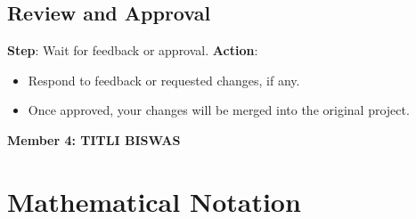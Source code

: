 \documentclass{article}
\begin{document}
\subsection{Review and Approval}
\textbf{Step}: Wait for feedback or approval.
\textbf{Action}:
\begin{itemize}
    \item Respond to feedback or requested changes, if any.
    \item Once approved, your changes will be merged into the original project.
\end{itemize}
\vspace{20in}

\begin{center}
\textbf{\LARGE{{Member 4: TITLI BISWAS}}} 
\end{center}
\section{Mathematical Notation}
\end{document}
